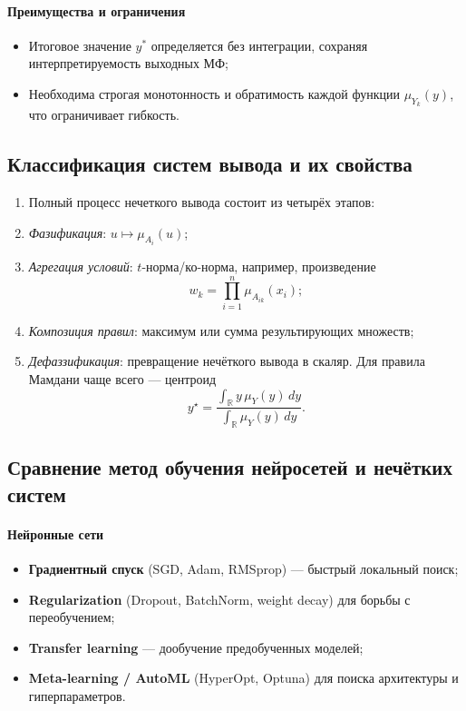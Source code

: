 \paragraph{Преимущества и ограничения}
\begin{itemize}
  \item Итоговое значение $y^*$ определяется без интеграции, сохраняя интерпретируемость выходных МФ;
  \item Необходима строгая монотонность и обратимость каждой функции $\mu_{Y_k}(y)$, что ограничивает гибкость.
\end{itemize}


\subsection{Классификация систем вывода и их свойства}
\label{subsec:classification}
\begin{enumerate}
  \item[] Полный процесс нечеткого вывода состоит из четырёх этапов:
  \item \emph{Фазификация}: $u\mapsto\mu_{A_i}(u)$;
  \item \emph{Агрегация условий}: $t$-норма/ко-норма,
        например, произведение
        \begin{equation}
          w_k=\prod_{i=1}^{n}\mu_{A_{ik}}(x_i);
          \label{eq:tprod}
        \end{equation}
  \item \emph{Композиция правил}: максимум или сумма
        результирующих множеств;
  \item \emph{Дефаззификация}: превращение
        нечёткого вывода в скаляр.  
        Для правила Мамдани чаще всего —
        центроид
        \begin{equation}
          y^\star=\frac{\displaystyle
                     \int_{\mathbb R} y\,\mu_Y(y)\,dy}
                     {\displaystyle\int_{\mathbb R}\mu_Y(y)\,dy}.
          \label{eq:centroid}
        \end{equation}
\end{enumerate}

\subsection{Сравнение метод обучения нейросетей и нечётких систем}
\label{subsec:training_methods}

\paragraph{Нейронные сети}
\begin{itemize}
  \item \textbf{Градиентный спуск} (SGD, Adam, RMSprop) — быстрый локальный поиск;
  \item \textbf{Regularization} (Dropout, BatchNorm, weight decay) для борьбы с переобучением;
  \item \textbf{Transfer learning} — дообучение предобученных моделей;
  \item \textbf{Meta-learning / AutoML} (HyperOpt, Optuna) для поиска архитектуры и гиперпараметров.
\end{itemize}

